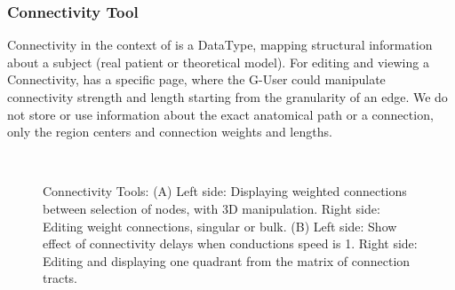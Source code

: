 	\subsubsection{Connectivity Tool}

Connectivity in the context of \TVB is a DataType, mapping structural information about a subject (real patient or theoretical model).
For editing and viewing a Connectivity, \TVB has a specific page, where the G-User could manipulate connectivity strength and length 
starting from the granularity of an edge.
We do not store or use information about the exact anatomical path or a connection, only the region centers and connection weights and lengths.

 \begin{figure}
 	\centering
	\\
	\caption{Connectivity Tools: 
	(A) Left side: Displaying weighted connections between selection of nodes, with 3D manipulation.
	Right side: Editing weight connections, singular or bulk.
	(B) Left side: Show effect of connectivity delays when conductions speed is 1.
	Right side: Editing and displaying one quadrant from the matrix of connection tracts.}
        \label{fig:connectivity}
\end{figure}



